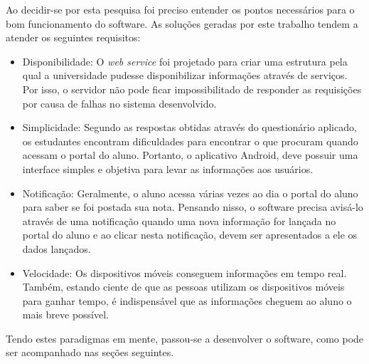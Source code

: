 	\par Ao decidir-se por esta pesquisa foi preciso entender os pontos
necessários para o bom funcionamento do software. As soluções geradas por este
trabalho tendem a atender os seguintes requisitos:

	\begin{itemize}
		
		\item Disponibilidade: O \textit{web service} foi projetado para criar uma
		estrutura pela qual a universidade pudesse disponibilizar informações através
		de serviços. Por isso, o servidor não pode ficar impossibilitado de responder
		as requisições por causa de falhas no sistema desenvolvido.
		
		\item Simplicidade: Segundo as respostas obtidas através do questionário
		aplicado, os estudantes encontram dificuldades para encontrar o que procuram
		quando acessam o portal do aluno. Portanto, o aplicativo Android, deve possuir
		uma interface simples e objetiva para levar as informações aos usuários.
		
		\item Notificação: Geralmente, o aluno acessa várias vezes ao dia o portal do
		aluno para saber se foi postada sua nota. Pensando nisso, o software precisa
		avisá-lo através de uma notificação quando uma nova informação for lançada no
		portal do aluno e ao clicar nesta notificação, devem ser apresentados a ele os
		dados lançados.
		
		\item Velocidade: Os dispositivos móveis conseguem informações em tempo real.
		Também, estando ciente de que as pessoas utilizam os dispositivos móveis para
		ganhar tempo, é indispensável que as informações cheguem ao aluno o mais breve
		possível.
	
	\end{itemize}

	\par Tendo estes paradigmas em mente, passou-se a desenvolver o software, como
pode ser acompanhado nas seções seguintes.
